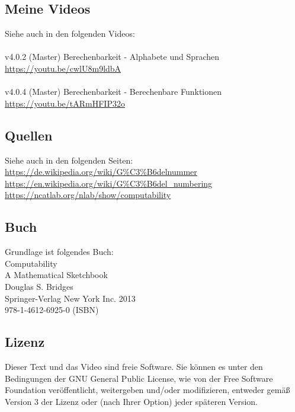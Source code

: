 \documentclass[a4paper]{amsart}
\theoremstyle{definition}
\begin{document}
\subsection*{Meine Videos}
Siehe auch in den folgenden Videos:\\
\\
v4.0.2 (Master) Berechenbarkeit - Alphabete und Sprachen\\
\url{https://youtu.be/cwlU8m9ldbA}\\
\\
v4.0.4 (Master) Berechenbarkeit - Berechenbare Funktionen\\
\url{https://youtu.be/tARmHFIP32o}

\subsection*{Quellen}
Siehe auch in den folgenden Seiten:\\
\url{https://de.wikipedia.org/wiki/G%C3%B6delnummer}\\
\url{https://en.wikipedia.org/wiki/G%C3%B6del_numbering}\\
\url{https://ncatlab.org/nlab/show/computability}

\subsection*{Buch}
Grundlage ist folgendes Buch:\\
Computability\\
A Mathematical Sketchbook\\
Douglas S. Bridges\\
Springer-Verlag New York Inc. 2013\\
978-1-4612-6925-0 (ISBN)

\subsection*{Lizenz}
Dieser Text und das Video sind freie Software. Sie können es unter den Bedingungen der
GNU General Public License, wie von der Free Software Foundation veröffentlicht, weitergeben
und/oder modifizieren, entweder gemäß Version 3 der Lizenz oder (nach Ihrer Option) jeder späteren Version.
\end{document}
